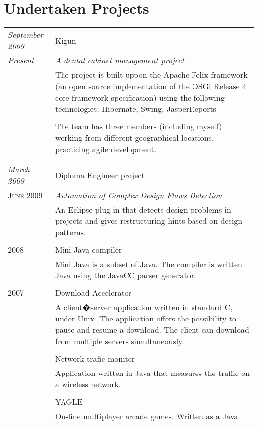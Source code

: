 \documentclass[a4paper,10pt]{article}
\begin{document}
\section{Undertaken Projects}
\begin{longtable}{p{2.5cm}|p{11cm}}
 \raggedleft \emph{September 2009} & Kigun \\
 \raggedleft \emph{Present} & \emph{A dental cabinet management project} \\
 & \footnotesize{The project is built uppon the Apache Felix framework (an open
 source implementation of the OSGi Release 4 core framework specification)
 using the following technologies: Hibernate, Swing, JasperReports} \\ \\
 & \footnotesize{The team has three members (including myself) working from
 different geographical locations, practicing agile development.} \\ \\
 \multicolumn{2}{c}{} \\ \raggedleft \emph{March 2009} & Diploma Engineer
 project \\ \raggedleft \textsc{June 2009} & \emph{Automation of Complex Design Flaws Detection} \\
 &\footnotesize{An Eclipse plug-in that detects design problems in projects and gives restructuring hints based on design patterns.}\\
 \multicolumn{2}{c}{} \\ 
 \raggedleft \textsc{2008} & Mini Java compiler \\ &
 \footnotesize{\href{http://compilers.cs.ucla.edu/vids/MCIIJ2E}{Mini Java} is a
 subset of Java. The compiler is written Java using the JavaCC parser
 generator.} \\ 
 \multicolumn{2}{c}{} \\ 
 \raggedleft \textsc{2007} & Download Accelerator \\& \footnotesize{A 
 client�server application written in standard C, under Unix. The application
 offers the possibility to pause and resume a download. The client can download
 from multiple servers simultaneously.}\\ 
 \multicolumn{2}{c}{} \\ 
 & Network trafic monitor \\ 
 & \footnotesize{Application written in Java that measures the traffic on a
 wireless network.} \\ 
 \multicolumn{2}{c}{} \\
 & YAGLE \\ & \footnotesize{On-line multiplayer arcade games. Written as a Java
}
\end{longtable}
\end{document}
